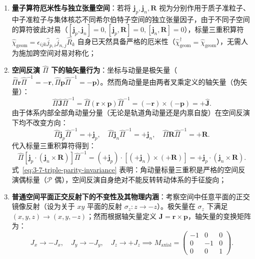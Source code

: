 \begin{enumerate}
\item \textbf{量子算符厄米性与独立张量空间}：若将 $\mathbf{j}_p, \mathbf{j}_n, \mathbf{R}$ 视为分别作用于质子准粒子、中子准粒子与集体核芯不同希尔伯特子空间的独立张量因子，由于不同子空间的算符彼此对易（$[\mathbf{j}_p, \mathbf{j}_n] = 0, [\mathbf{j}_p, \mathbf{R}] = 0, [\mathbf{j}_n, \mathbf{R}] = 0$），标量三重积算符 $\hat{\chi}_{\text{geom}} = \epsilon_{ijk} \hat{j}_{p,i} \hat{j}_{n,j} \hat{R}_k$ 自身已天然具备严格的厄米性（$\hat{\chi}_{\text{geom}}^\dagger = \hat{\chi}_{\text{geom}}$），无需人为施加跨空间对易对称化；
\item \textbf{空间反演 $\hat{\Pi}$ 下的轴矢量行为}：坐标与动量是极矢量（$\hat{\Pi} \mathbf{r} \hat{\Pi}^{-1} = -\mathbf{r}, \hat{\Pi} \mathbf{p} \hat{\Pi}^{-1} = -\mathbf{p}$）。然而角动量是由两者叉乘定义的轴矢量（伪矢量）：
\begin{equation}\label{eq:3-7-L-parity}
\hat{\Pi} \hat{\mathbf{J}} \hat{\Pi}^{-1} = \hat{\Pi} (\mathbf{r} \times \mathbf{p}) \hat{\Pi}^{-1} = (-\mathbf{r}) \times (-\mathbf{p}) = + \hat{\mathbf{J}}.
\end{equation}
由于体系内部全部角动量分量（无论是轨道角动量还是内禀自旋）在空间反演下均不改变方向：
\begin{equation}\label{eq:3-7-components-parity}
\hat{\Pi} \mathbf{j}_p \hat{\Pi}^{-1} = +\mathbf{j}_p, \quad \hat{\Pi} \mathbf{j}_n \hat{\Pi}^{-1} = +\mathbf{j}_n, \quad \hat{\Pi} \mathbf{R} \hat{\Pi}^{-1} = +\mathbf{R}.
\end{equation}
代入标量三重积算符得到：
\begin{equation}\label{eq:3-7-triple-parity-invariance}
\hat{\Pi} \left[ \mathbf{j}_p \cdot (\mathbf{j}_n \times \mathbf{R}) \right] \hat{\Pi}^{-1} = (+\mathbf{j}_p) \cdot \left[ (+\mathbf{j}_n) \times (+\mathbf{R}) \right] = + \mathbf{j}_p \cdot (\mathbf{j}_n \times \mathbf{R}).
\end{equation}
式~\eqref{eq:3-7-triple-parity-invariance} 表明：角动量标量三重积是严格的空间反演偶标量（$\mathcal{P}$ 偶），空间反演自身绝对不能反转转动体系的手征旋向；
\item \textbf{普通空间平面正交反射下的不变性及其物理内涵}：考察空间中任意平面的正交镜像反射（设为关于 $xy$ 平面的反射 $\sigma_z: z \to -z$）。极矢量在 $\sigma_z$ 下满足 $(x, y, z) \to (x, y, -z)$；然而根据轴矢量定义 $\mathbf{J} = \mathbf{r} \times \mathbf{p}$，轴矢量的变换矩阵为：
\begin{equation}\label{eq:3-7-axial-reflection}
J_x \to -J_x, \quad J_y \to -J_y, \quad J_z \to +J_z \implies M_{\text{axial}} = \begin{pmatrix} -1 & 0 & 0 \\ 0 & -1 & 0 \\ 0 & 0 & 1 \end{pmatrix}.

\end{equation}
\end{enumerate}
